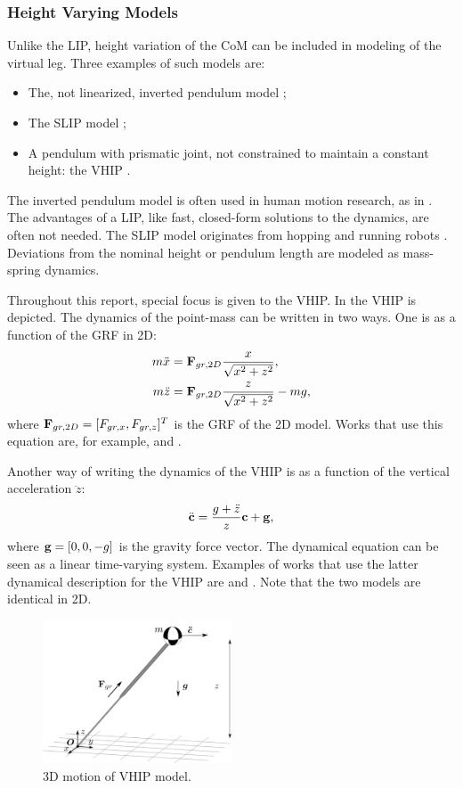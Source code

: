 \subsubsection{Height Varying Models} 
Unlike the \ac{LIP}, height variation of the \ac{CoM} can be included in modeling of the virtual leg. Three examples of such models are:
\begin{itemize}
	\item The, not linearized, inverted pendulum model \cite{kuo2005energetic};
	\item The \ac{SLIP} model \cite{liu2015trajectory};
	\item A pendulum with prismatic joint, not constrained to maintain a constant height: the \ac{VHIP} \cite{pratt2007derivation}.
\end{itemize}
The inverted pendulum model is often used in human motion research, as in \cite{kuo2005energetic}. The advantages of a \ac{LIP}, like fast, closed-form solutions to the dynamics, are often not needed. The \ac{SLIP} model originates from hopping and running robots \cite{schwind1998spring}. Deviations from the nominal height or pendulum length are modeled as mass-spring dynamics. 

Throughout this report, special focus is given to the \ac{VHIP}. In  the \ac{VHIP} is depicted. The dynamics of the point-mass can be written in two ways. One is as a function of the \ac{GRF} in \ac{2D}:
\begin{align}
	m\ddot{x} &= \mathbf{F}_{gr,2D}\frac{x}{\sqrt{x^2 + z^2}},\\
	m\ddot{z} &= \mathbf{F}_{gr,2D}\frac{z}{\sqrt{x^2 + z^2}} - mg,
	\label{eq:dynamicsprattstyle}
\end{align}
where $\mathbf{F}_{gr,2D}=[F_{gr,x}, F_{gr,z}]^T$ is the \ac{GRF} of the \ac{2D}  model. Works that use this equation are, for example, \cite{pratt2007derivation} and \cite{koolen2016balance}.

Another way of writing the dynamics of the \ac{VHIP} is as a function of the vertical acceleration $\ddot{z}$:
\begin{equation}
	\ddot{\mathbf{c}} = \frac{g+\ddot{z}}{z}\mathbf{c} + \mathbf{g},
	\label{eq:dynamicscaronstyle}
\end{equation}
where $\mathbf{g}=[0,0,-g]$ is the gravity force vector. The dynamical equation can be seen as a linear time-varying system. Examples of works that use the latter dynamical description for the \ac{VHIP} are \cite{hopkins2014humanoid} and \cite{caron2018balance}. Note that the two models are identical in \ac{2D}.
\begin{figure}
\centering
\includegraphics[width=0.5\textwidth]{STYLESTUFF/3DCoMwithoutfootVHIP.png}
\caption{\ac{3D} motion of \ac{VHIP} model.}
\label{fig:3dvhip}
\end{figure}

